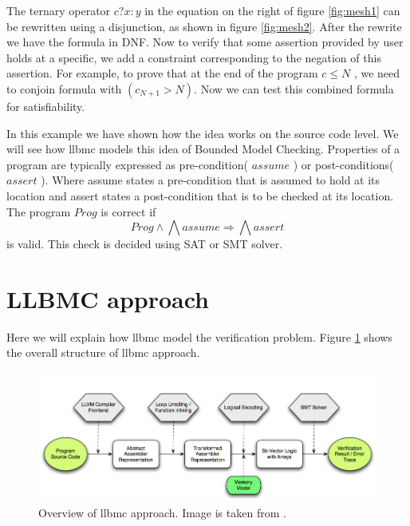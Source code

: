 \documentclass[14pt]{article}
\begin{document}
The ternary operator \(c?x:y\) in the equation on the right of figure \ref{fig:mesh1} can be rewritten using a disjunction, as shown in figure \ref{fig:mesh2}. After the rewrite we have the formula in DNF. Now to verify that some assertion provided by user holds at a specific, we add a constraint corresponding to the negation of this assertion. For example, to prove that at the end of the program \(c \leq N\) , we need to conjoin formula with \((c_{N+1}>N)\). Now we can test this combined formula for satisfiability. 

In this example we have shown how the idea works on the source code level. We will see how llbmc models this idea of Bounded Model Checking. Properties of a program are typically expressed  as pre-condition( \(assume\) ) or post-conditions( \(assert\) ). Where assume states a pre-condition that is assumed to hold at its location and assert states a post-condition that is to be checked at its location. The program  \(Prog\)  is correct if
\[Prog \wedge \bigwedge assume \Rightarrow  \bigwedge assert\]
is valid. This check is decided using SAT or SMT solver. 


\section{LLBMC approach}\label{lbmc approach}
Here we will explain how llbmc model the verification problem.  Figure \ref{fig:llbmc_overview} shows the overall structure of llbmc approach.  
\begin{figure}[htb!]
  \begin{centering}
    \includegraphics[scale=0.5]{figures/llbmc_overview}\par
  \end{centering}
  \caption{ Overview of llbmc approach. Image is taken from \cite{llbmc2}.}
  \label{fig:llbmc_overview}
\end{figure}
\end{document}
